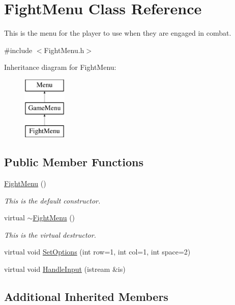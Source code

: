\hypertarget{classFightMenu}{\section{Fight\-Menu Class Reference}
\label{classFightMenu}
}


This is the menu for the player to use when they are engaged in combat.  




{\ttfamily \#include $<$Fight\-Menu.\-h$>$}

Inheritance diagram for Fight\-Menu\-:\begin{figure}[H]
\begin{center}
\leavevmode
\includegraphics[height=3.000000cm]{classFightMenu}
\end{center}
\end{figure}
\subsection*{Public Member Functions}
\begin{DoxyCompactItemize}
\item 
\hyperlink{classFightMenu_a9f030d9a49e5b81dbaea8eab936cdf80}{Fight\-Menu} ()
\begin{DoxyCompactList}\small\item\em This is the default constructor. \end{DoxyCompactList}\item 
virtual \hyperlink{classFightMenu_a8a8792d7c674b0f19cdc9bf3a5ae96ca}{$\sim$\-Fight\-Menu} ()
\begin{DoxyCompactList}\small\item\em This is the virtual destructor. \end{DoxyCompactList}\item 
virtual void \hyperlink{classFightMenu_a234a915424eb00727d304834a4af352c}{Set\-Options} (int row=1, int col=1, int space=2)
\item 
virtual void \hyperlink{classFightMenu_a6d69cf9a19e7bae304d5a116285c1a51}{Handle\-Input} (istream \&is)
\end{DoxyCompactItemize}
\subsection*{Additional Inherited Members}


